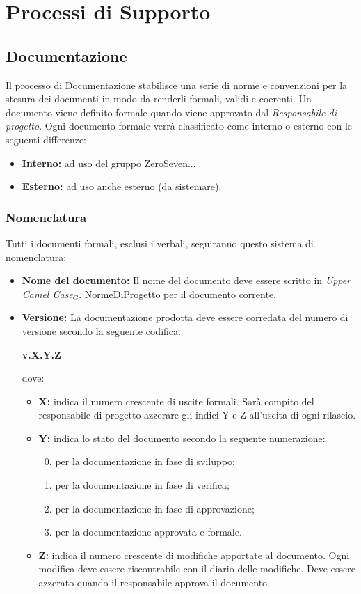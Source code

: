 \section{Processi di Supporto}
\subsection{Documentazione}
Il processo di Documentazione stabilisce una serie di norme e convenzioni per la stesura dei documenti in modo da renderli formali, validi e coerenti.
Un documento viene definito formale quando viene approvato dal \textit{Responsabile di progetto}.
Ogni documento formale verrà classificato come interno o esterno con le seguenti differenze:
\begin{itemize}
	\item \textbf{Interno:} ad uso del gruppo ZeroSeven... 
	\item \textbf{Esterno:} ad uso anche esterno (da sistemare). 
	
\end{itemize}

\subsubsection{Nomenclatura}
Tutti i documenti formali, esclusi i verbali, seguiranno questo sistema di nomenclatura:
\begin{itemize}
	\item \textbf{Nome del documento:} Il nome del documento deve essere scritto in \textit{Upper Camel Case$_{G}$}.
	NormeDiProgetto per il documento corrente. 
	\item \textbf{Versione:} La documentazione prodotta deve essere corredata del numero di versione secondo la seguente codifica:
	
	\textbf{v.X.Y.Z}
	
	dove:
	\begin{itemize}
		\item \textbf{X:} indica il numero crescente di uscite formali. Sarà compito del responsabile di progetto azzerare gli indici Y e Z all'uscita di ogni rilascio.
		\item \textbf{Y:} indica lo stato del documento secondo la seguente numerazione:
		\begin{enumerate}
			\setcounter{enumi}{-1}
			\item per la documentazione in fase di sviluppo;
			\item per la documentazione in fase di verifica;
			\item per la documentazione in fase di approvazione;
			\item per la documentazione approvata e formale.
		\end{enumerate}
		\item \textbf{Z:} indica il numero crescente di modifiche apportate al documento. Ogni modifica deve essere riscontrabile con il diario delle modifiche. Deve essere azzerato quando il responsabile approva il documento. 	
	\end{itemize}
\end{itemize}

